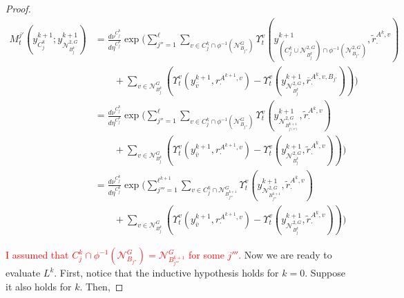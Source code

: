 \documentclass[12pt]{article}
\newcommand{\mc}{\mathcal}
\newcommand{\ov}{\overline}
\newcommand{\tr}{\textcolor{red}}
\newcommand{\gneigh}[2]{\mc{N}^{#1}_{#2}}			%
\newcommand{\dgneigh}[2]{\mc{N}^{2,#1}_{#2}}		%
\newcommand{\cl}[1]{\ov{#1}}						%
\newcommand{\indx}[1]{^{#1}}						%
\newcommand{\rate}{r}								%
\newcommand{\xg}{y}									%
\newcommand{\vind}[1]{_{#1}}						%
\newcommand{\vpara}[1]{^{#1}}						%
\newcommand{\stpara}[1]{_{#1}}						%
\newcommand{\tpara}[1]{_{#1}}						%
\newcommand{\gvpara}[2]{^{#1,#2}}					%
\newcommand{\psize}{\ell}							%
\newcommand{\brate}{\alt{\rate}}					%
\newcommand{\alt}[1]{\tilde{#1}}					%
\newcommand{\mm}{\nu}								%
\newcommand{\bgrate}{\ov{\rate}}					%
\newcommand{\mmm}{\eta}								%
\newcommand{\ds}{\Upsilon}							%
\newcommand{\dense}{L}								%
\newcommand{\mdense}{M}								%
\newcommand{\gvjpara}[3]{^{#1,#2,#3}}				%
\newcommand{\jpara}[1]{^{#1}}						%
\begin{document}
\begin{proof}
\begin{align*}
\mdense\jpara{j'}\tpara{t}\left(\xg\indx{k+1}\vind{C_j\indx{k}};\xg\indx{k+1}\vind{\dgneigh{G}{B\indx{k}_j}}\right)&=  \frac{d\mm\vpara{C_j\indx{k}}}{d\mmm\vpara{C_j\indx{k}}}\exp\Bigg(\sum_{j'' =1}^{\psize}\sum_{v \in C_j\indx{k}\cap\phi^{-1}(\gneigh{G}{B_{j''}})} \ds\vpara{v}\tpara{t}\left(\xg\indx{k+1}\vind{\left(C_j\indx{k}\cup\dgneigh{G}{B_j\indx{k}}\right)\cap\phi^{-1}(\dgneigh{G}{B_{j''}})},\brate\gvpara{A\indx{k}}{v}\stpara{\cdot}\right)\\
&\hspace{24pt} + \sum_{v \in \gneigh{G}{B_j\indx{k}}}\left(\ds\vpara{v}\tpara{t}\left(\xg\indx{k+1}\vind{\cl{v}},\rate\gvpara{A\indx{k+1}}{v}\stpara{\cdot}\right) - \ds\vpara{v}\tpara{t}\left(\xg\indx{k+1}\vind{\dgneigh{G}{B_j\indx{k}}},\bgrate\gvjpara{A\indx{k}}{v}{B_{j'}}\stpara{\cdot}\right)\right)\Bigg)\\
&=\frac{d\mm\vpara{C_j\indx{k}}}{d\mmm\vpara{C_j\indx{k}}}\exp\Bigg(\sum_{j'' =1}^{\psize}\sum_{v \in C_j\indx{k}\cap\phi^{-1}(\gneigh{G}{B_{j''}})}\ds\vpara{v}\tpara{t}\left(\xg\indx{k+1}\vind{\dgneigh{G}{B_{j(v)}\indx{k+1}}},\brate\gvpara{A\indx{k}}{v}\stpara{\cdot}\right)\\
&\hspace{24pt} + \sum_{v \in \gneigh{G}{B_j\indx{k}}}\left(\ds\vpara{v}\tpara{t}\left(\xg\indx{k+1}\vind{\cl{v}},\rate\gvpara{A\indx{k+1}}{v}\stpara{\cdot}\right) - \ds\vpara{v}\tpara{t}\left(\xg\indx{k+1}\vind{\dgneigh{G}{B_j\indx{k}}},\brate\gvpara{A\indx{k}}{v}\stpara{\cdot}\right)\right)\Bigg)\\
&=\frac{d\mm\vpara{C_j\indx{k}}}{d\mmm\vpara{C_j\indx{k}}}\exp\Bigg(\sum_{j'''=1}^{\psize\indx{k+1}}\sum_{v \in C_j\indx{k}\cap\gneigh{G}{B_{j'''}\indx{k+1}}}\ds\vpara{v}\tpara{t}\left(\xg\indx{k+1}\vind{\dgneigh{G}{B_{j'''}\indx{k+1}}},\brate\gvpara{A\indx{k}}{v}\stpara{\cdot}\right)\\
&\hspace{24pt} + \sum_{v \in \gneigh{G}{B_j\indx{k}}}\left(\ds\vpara{v}\tpara{t}\left(\xg\indx{k+1}\vind{\cl{v}},\rate\gvpara{A\indx{k+1}}{v}\stpara{\cdot}\right) - \ds\vpara{v}\tpara{t}\left(\xg\indx{k+1}\vind{\dgneigh{G}{B_j\indx{k}}},\brate\gvpara{A\indx{k}}{v}\stpara{\cdot}\right)\right)\Bigg)
\end{align*}

\tr{I assumed that \(C_j\indx{k}\cap\phi^{-1}(\gneigh{G}{B_{j''}}) = \gneigh{G}{B_{j'''}\indx{k+1}}\) for some \(j'''\). }Now we are ready to evaluate \(\dense\indx{k}\). First, notice that the inductive hypothesis holds for \(k=0\). Suppose it also holds for \(k\). Then,


\end{proof}
\end{document}
